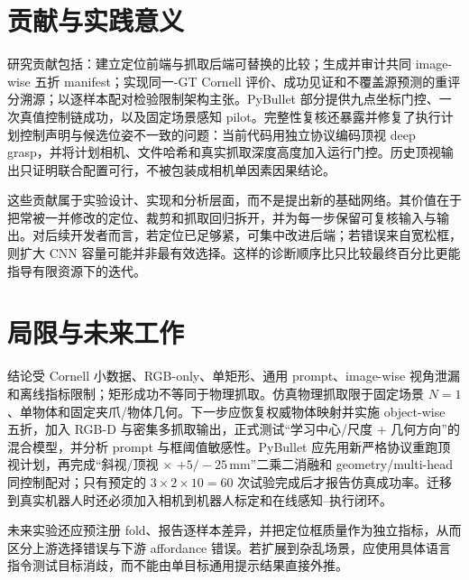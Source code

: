 \documentclass{l4proj}
\begin{document}
\section{贡献与实践意义}
研究贡献包括：建立定位前端与抓取后端可替换的比较；生成并审计共同 image-wise 五折 manifest；实现同一-GT Cornell 评价、成功见证和不覆盖源预测的重评分溯源；以逐样本配对检验限制架构主张。PyBullet 部分提供九点坐标门控、一次真值控制链成功，以及固定场景感知 pilot。完整性复核还暴露并修复了执行计划控制声明与候选位姿不一致的问题：当前代码用独立协议编码顶视 deep grasp，并将计划相机、文件哈希和真实抓取深度高度加入运行门控。历史顶视输出只证明联合配置可行，不被包装成相机单因素因果结论。

这些贡献属于实验设计、实现和分析层面，而不是提出新的基础网络。其价值在于把常被一并修改的定位、裁剪和抓取回归拆开，并为每一步保留可复核输入与输出。对后续开发者而言，若定位已足够紧，可集中改进后端；若错误来自宽松框，则扩大 CNN 容量可能并非最有效选择。这样的诊断顺序比只比较最终百分比更能指导有限资源下的迭代。

\section{局限与未来工作}
结论受 Cornell 小数据、RGB-only、单矩形、通用 prompt、image-wise 视角泄漏和离线指标限制；矩形成功不等同于物理抓取。仿真物理抓取限于固定场景 $N=1$、单物体和固定夹爪/物体几何。下一步应恢复权威物体映射并实施 object-wise 五折，加入 RGB-D 与密集多抓取输出，正式测试“学习中心/尺度 + 几何方向”的混合模型，并分析 prompt 与框阈值敏感性。PyBullet 应先用新严格协议重跑顶视计划，再完成“斜视/顶视 $\times$ $+5/-25$\,mm”二乘二消融和 geometry/multi-head 同控制配对；只有预定的 $3\times2\times10=60$ 次试验完成后才报告仿真成功率。迁移到真实机器人时还必须加入相机到机器人标定和在线感知--执行闭环。

未来实验还应预注册 fold、报告逐样本差异，并把定位框质量作为独立指标，从而区分上游选择错误与下游 affordance 错误。若扩展到杂乱场景，应使用具体语言指令测试目标消歧，而不能由单目标通用提示结果直接外推。
\end{document}
